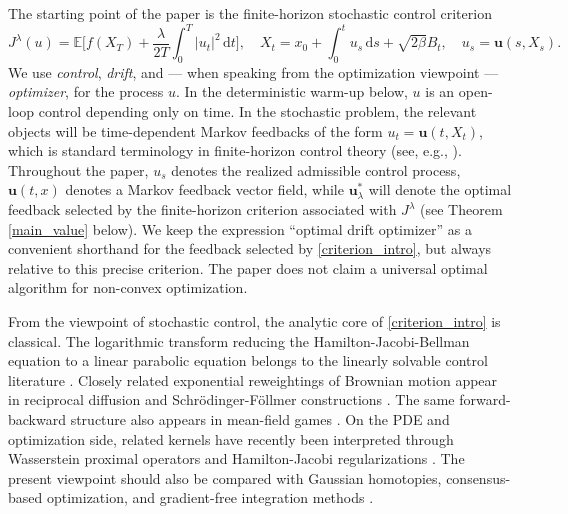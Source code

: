 \documentclass[11pt]{amsart}
\newcommand{\E}{\mathbb{E}}
\newcommand{\dd}{\,\mathrm{d}}
\renewcommand{\Vert}{|}
\numberwithin{equation}{section}
\numberwithin{figure}{section}
\theoremstyle{definition}\newtheorem{remark}[theorem]{Remark}%
\begin{document}
The starting point of the paper is the finite-horizon stochastic control criterion
\begin{equation}\label{criterion_intro}
J^\lambda(u) = \E \bigg[ f(X_T) + \frac{\lambda}{2T}\int_0^T \Vert u_t \Vert^2 \dd t \bigg],
\quad
X_t = x_0 + \int_0^t u_s \dd s + \sqrt{2\beta}B_t, \quad u_s = \mathbf u(s,X_s).
\end{equation}
We use \emph{control}, \emph{drift}, and --- when speaking from the optimization viewpoint --- \emph{optimizer}, for the process $u$. In the deterministic warm-up below, $u$ is an open-loop control depending only on time. In the stochastic problem, the relevant objects will be time-dependent Markov feedbacks of the form $u_t = \mathbf u(t,X_t)$, which is standard terminology in finite-horizon control theory (see, e.g., \cite{FlemingSoner06, TrelatBook, YongZhou99}). Throughout the paper, $u_s$ denotes the realized admissible control process,  $\mathbf u(t,x)$ denotes a Markov feedback vector field, while $\mathbf u_\lambda^*$ will denote the optimal feedback selected by the finite-horizon criterion associated with $J^\lambda$ (see Theorem \ref{main_value} below).
We keep the expression ``optimal drift optimizer'' as a convenient shorthand for the feedback selected by \eqref{criterion_intro}, but always relative to this precise criterion. The paper does not claim a universal optimal algorithm for non-convex optimization. 

From the viewpoint of stochastic control, the analytic core of \eqref{criterion_intro} is classical. The logarithmic transform reducing the Hamilton-Jacobi-Bellman equation to a linear parabolic equation belongs to the linearly solvable control literature \cite{Kappen05,Todorov06,Todorov09}. Closely related exponential reweightings of Brownian motion appear in reciprocal diffusion and Schr\"odinger-F\"ollmer constructions \cite{DaiJiaoKangLuYang23, DaiPra91, Follmer85, HuangJiaoKangLiaoLiuLiu21, TzenRaginsky19, ZhangChen22}. The same forward-backward structure also appears in mean-field games \cite{BensoussanFrehseYam13, LasryLions07}. On the PDE and optimization side, related kernels have recently been interpreted through Wasserstein proximal operators and Hamilton-Jacobi regularizations \cite{HuangKaliseKouhkouh25,HeatonFungOsher24, LiLiuOsher23, OsherHeatonFung23}. The present viewpoint should also be compared with Gaussian homotopies, consensus-based optimization, and gradient-free integration methods \cite{AndrieuChopinFincatoGerber24, CarrilloChoiTotzeckTse18, FornasierKlockRiedl24, IwakiriWangItoTakeda22}.
\end{document}

